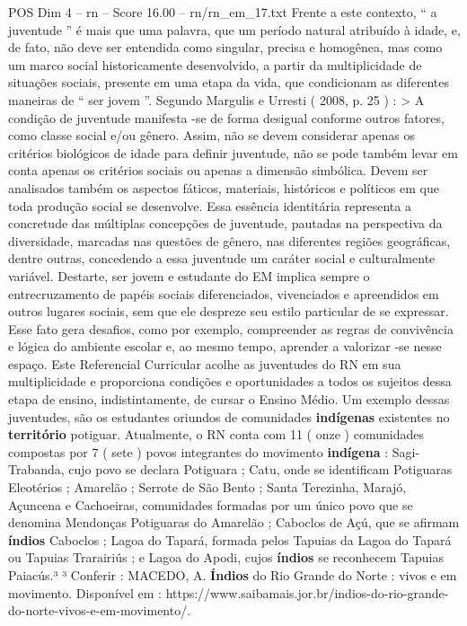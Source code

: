 \begin{textsample}{POS Dim 4 – rn – Score 16.00 – rn/rn\_em\_17.txt}
Frente a este contexto, “ a juventude ” é mais que uma palavra, que um período natural atribuído à idade, e, de fato, não deve ser entendida como singular, precisa e homogênea, mas como um marco social historicamente desenvolvido, a partir da multiplicidade de situações sociais, presente em uma etapa da vida, que condicionam as diferentes maneiras de “ ser jovem ”.
Segundo Margulis e Urresti ( 2008, p. 25 ) : > A condição de juventude manifesta -se de forma desigual conforme outros fatores, como classe social e/ou gênero.
Assim, não se devem considerar apenas os critérios biológicos de idade para definir juventude, não se pode também levar em conta apenas os critérios sociais ou apenas a dimensão simbólica.
Devem ser analisados também os aspectos fáticos, materiais, históricos e políticos em que toda produção social se desenvolve.
Essa essência identitária representa a concretude das múltiplas concepções de juventude, pautadas na perspectiva da diversidade, marcadas nas questões de gênero, nas diferentes regiões geográficas, dentre outras, concedendo a essa juventude um caráter social e culturalmente variável.
Destarte, ser jovem e estudante do EM implica sempre o entrecruzamento de papéis sociais diferenciados, vivenciados e apreendidos em outros lugares sociais, sem que ele despreze seu estilo particular de se expressar.
Esse fato gera desafios, como por exemplo, compreender as regras de convivência e lógica do ambiente escolar e, ao mesmo tempo, aprender a valorizar -se nesse espaço.
Este Referencial Curricular acolhe as juventudes do RN em sua multiplicidade e proporciona condições e oportunidades a todos os sujeitos dessa etapa de ensino, indistintamente, de cursar o Ensino Médio.
Um exemplo dessas juventudes, são os estudantes oriundos de comunidades \textbf{indígenas} existentes no \textbf{território} potiguar.
Atualmente, o RN conta com 11 ( onze ) comunidades compostas por 7 ( sete ) povos integrantes do movimento \textbf{indígena} : Sagi-Trabanda, cujo povo se declara Potiguara ; Catu, onde se identificam Potiguaras Eleotérios ; Amarelão ; Serrote de São Bento ; Santa Terezinha, Marajó, Açuncena e Cachoeiras, comunidades formadas por um único povo que se denomina Mendonças Potiguaras do Amarelão ; Caboclos de Açú, que se afirmam \textbf{índios} Caboclos ; Lagoa do Tapará, formada pelos Tapuias da Lagoa do Tapará ou Tapuias Trarairiús ; e Lagoa do Apodi, cujos \textbf{índios} se reconhecem Tapuias Paiacús.³ ³ Conferir : MACEDO, A. \textbf{Índios} do Rio Grande do Norte : vivos e em movimento.
Disponível em : https://www.saibamais.jor.br/indios-do-rio-grande-do-norte-vivos-e-em-movimento/.

\end{textsample}
